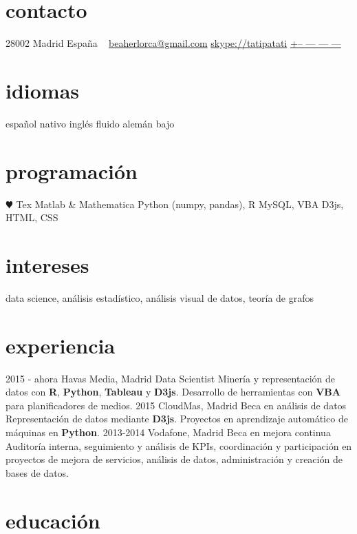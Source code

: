 \documentclass[]{friggeri-cv}
\begin{document}
\begin{aside}
  \section{contacto}
    28002 Madrid
    España
    ~
    \href{mailto:beaherlorca@gmail.com}{beaherlorca@gmail.com}
    \href{skype:<tatipatati>[add]}{skype://tatipatati}
    \href{tel:xxxxxxxxxxx}{+-- --- --- ---}
  \section{idiomas}
    español nativo
    inglés fluido
    alemán bajo
  \section{programación}
    {\color{red} $\varheartsuit$} Tex
    Matlab \& Mathematica
    Python (numpy, pandas), R
    MySQL, VBA
    D3js, HTML, CSS
\end{aside}

\section{intereses}

data science, análisis estadístico, análisis visual de datos, teoría de grafos

\section{experiencia}

\begin{entrylist}
  \entry
    {2015 - ahora}
    {Havas Media, Madrid}
    {Data Scientist}
    {Minería y representación de datos con \textbf{R}, \textbf{Python}, \textbf{Tableau} y \textbf{D3js}. Desarrollo de herramientas con \textbf{VBA} para planificadores de medios.}
  \entry
    {2015}
    {CloudMas, Madrid}
    {Beca en análisis de datos}
    {Representación de datos mediante \textbf{D3js}. Proyectos en aprendizaje automático de máquinas en \textbf{Python}.}
  \entry
    {2013-2014}
    {Vodafone, Madrid}
    {Beca en mejora continua}
    {Auditoría interna, seguimiento y análisis de KPIs, coordinación y participación en proyectos de mejora de servicios, análisis de datos, administración y creación de bases de datos.}
\end{entrylist}

\section{educación}
\end{document}
